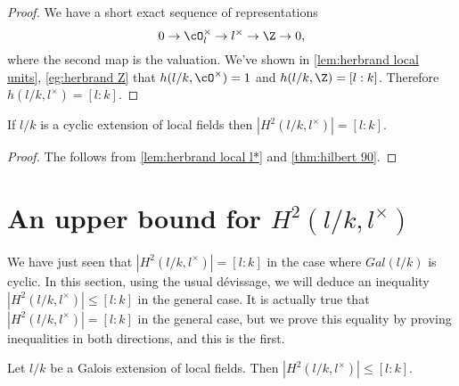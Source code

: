\begin{proof}
	We have a short exact sequence of representations
	\[
		0 \to \cO_l^\times \to l^\times \to \Z \to 0,
 	\]
	where the second map is the valuation.
	We've shown in \ref{lem:herbrand local units}, \ref{eg:herbrand Z}
	that $h(l/k,\cO^\times)=1$ and $h(l/k,\Z) = [l:k]$.
	Therefore $h(l/k,l^\times) = [l:k]$.
\end{proof}


\begin{lemma} \label{lem:local H2 l*}
	If $l/k$ is a cyclic extension of local fields
	then $|H^2(l/k,l^\times)| = [l:k]$.
\end{lemma}

\begin{proof}
	The follows from \ref{lem:herbrand local l*} and \ref{thm:hilbert 90}.
\end{proof}




\section{An upper bound for \texorpdfstring{$H^2(l/k,l^\times)$}{H2(l/k,l*)}}

We have just seen that $|H^2(l/k,l^\times)|=[l:k]$ in the case where $Gal(l/k)$ is
cyclic. In this section, using the usual d\'evissage, we will deduce an
inequality $|H^2(l/k,l^\times)|\leq[l:k]$ in the general case. It is actually
true that $|H^2(l/k,l^\times)|=[l:k]$ in the general case, but we prove this
equality by proving inequalities in both directions, and this is the first.
\begin{theorem} \label{lem:local H2 upper bound}
	Let $l/k$ be a Galois extension of local fields.
	Then $|H^2(l/k,l^\times)| \le [l:k]$.
\end{theorem}

